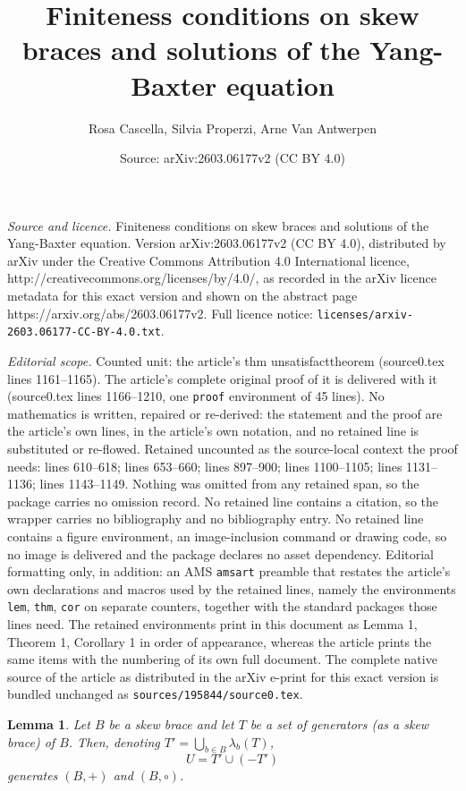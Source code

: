 \documentclass[10pt,a4paper]{amsart}
\title{Finiteness conditions on skew braces and solutions of the Yang-Baxter equation}
\author{Rosa Cascella, Silvia Properzi, Arne Van Antwerpen}
\date{Source: arXiv:2603.06177v2 (CC BY 4.0)}
\newtheorem{lem}{Lemma}
\begin{document}
\maketitle

\noindent\emph{Source and licence.} Finiteness conditions on skew braces and solutions of the Yang-Baxter equation. Version arXiv:2603.06177v2 (CC BY 4.0), distributed by arXiv under the Creative Commons Attribution 4.0 International licence, http://creativecommons.org/licenses/by/4.0/, as recorded in the arXiv licence metadata for this exact version and shown on the abstract page https://arxiv.org/abs/2603.06177v2. Full licence notice: \texttt{licenses/arxiv-2603.06177-CC-BY-4.0.txt}.\par\smallskip

\noindent\textit{Editorial scope.} Counted unit: the article's thm unsatisfacttheorem (source0.tex lines 1161--1165). The article's complete original proof of it is delivered with it (source0.tex lines 1166--1210, one \texttt{proof} environment of 45 lines). No mathematics is written, repaired or re-derived: the statement and the proof are the article's own lines, in the article's own notation, and no retained line is substituted or re-flowed.  Retained uncounted as the source-local context the proof needs: lines 610--618; lines 653--660; lines 897--900; lines 1100--1105; lines 1131--1136; lines 1143--1149.  Nothing was omitted from any retained span, so the package carries no omission record.  No retained line contains a citation, so the wrapper carries no bibliography and no bibliography entry.  No retained line contains a figure environment, an image-inclusion command or drawing code, so no image is delivered and the package declares no asset dependency.  Editorial formatting only, in addition: an AMS \texttt{amsart} preamble that restates the article's own declarations and macros used by the retained lines, namely the environments \texttt{lem}, \texttt{thm}, \texttt{cor} on separate counters, together with the standard packages those lines need.  The retained environments print in this document as Lemma 1, Theorem 1, Corollary 1 in order of appearance, whereas the article prints the same items with the numbering of its own full document.  The complete native source of the article as distributed in the arXiv e-print for this exact version is bundled unchanged as \texttt{sources/195844/source0.tex}.
\begin{lem}
\label{gens}
    Let $B$ be a skew brace and let $T$ be a set of generators (as a skew brace) of $B$.
    Then, denoting $T'=\bigcup_{b\in B}\lambda_b(T)$,
    \[
    U=T' \cup (-T')
    \] 
    generates $(B,+)$ and $(B,\circ)$.
\end{lem}
\end{document}

